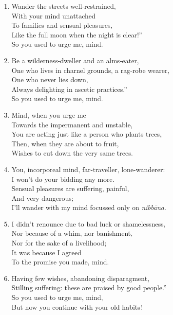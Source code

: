 \documentclass[10pt, openany]{book}
\newcommand*{\vleftofline}[1]{\leavevmode\llap{#1}}
\begin{document}
\begin{enumerate}
\item \vleftofline{“}Wander the streets well-restrained,\\
With your mind unattached \\
To families and sensual pleasures,\\
Like the full moon when the night is clear!”\\
So you used to urge me, mind.

\item \vleftofline{“}Be a wilderness-dweller and an alms-eater,\\
One who lives in charnel grounds, a rag-robe wearer,\\
One who never lies down, \\
Always delighting in ascetic practices.”\\
So you used to urge me, mind.

\item Mind, when you urge me \\
Towards the impermanent and unstable,\\
You are acting just like a person who plants trees,\\
Then, when they are about to fruit,\\
Wishes to cut down the very same trees.

\item You, incorporeal mind, far-traveller, lone-wanderer:\\
I won’t do your bidding any more.\\
Sensual pleasures are suffering, painful, \\
And very dangerous;\\
I’ll wander with my mind focussed only on \emph{nibbāna}.

\item I didn’t renounce due to bad luck or shamelessness,\\
Nor because of a whim, nor banishment,\\
Nor for the sake of a livelihood;\\
It was because I agreed \\
To the promise you made, mind.

\item \vleftofline{“}Having few wishes, abandoning disparagment,\\
Stilling suffering: these are praised by good people.”\\
So you used to urge me, mind,\\
But now you continue with your old habits!


\end{enumerate}
\end{document}
